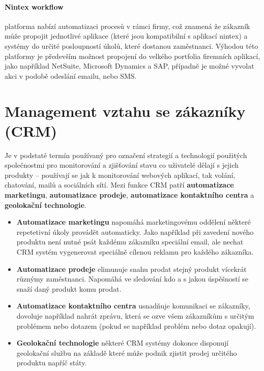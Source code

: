 \paragraph{Nintex workflow} platforma nabízí automatizaci procesů v rámci firmy, což znamená že zákazník může propojit jednotlivé aplikace (které jsou kompatibilní s aplikací nintex) a systémy do určité posloupností úkolů, které dostanou zaměstnanci. Výhodou této platformy je především možnost propojení do velkého portfolia firemních aplikací, jako například NetSuite, Microsoft Dynamics a SAP, případně je možné vyvolat akci v podobě odeslání emailu, nebo SMS.

\section{Management vztahu se zákazníky (CRM)}
\par Je v podstatě termín používaný pro označení strategií a technologií použitých společnostmi pro monitorování a zjišťování stavu co uživatelé dělají s jejich produkty -- používají se jak k monitorování webových aplikací, tak volání, chatování, mailů a sociálních sítí. Mezi funkce CRM patří \textbf{automatizace marketingu}, \textbf{automatizace prodeje}, \textbf{automatizace kontaktního centra} a \textbf{geolokační technologie}. \cite{crm}

\begin{itemize}
  \item \textbf{Automatizace marketingu} napomáhá marketingovému oddělení některé repetetivní úkoly provádět automaticky. Jako například při zavedení nového produktu není nutné psát každému zákazníku speciální email, ale nechat CRM systém vygenerovat speciálně cílenou reklamu pro každého zákazníka.
  \item \textbf{Automatizace prodeje} elimunuje snahu prodat stejný produkt vícekrát různýmy zaměstnanci. Napomáhá ve sledování kdo a s jakou úspěšností se snaží daný produkt komu prodat.
  \item \textbf{Automatizace kontaktního centra} usnadňuje komunikaci se zákazníky, dovoluje například nahrát zprávu, která se ozve všem zákazníkům s určitým problémem nebo dotazem (pokud se například problém nebo dotaz opakují).
  \item \textbf{Geolokační technologie} některé CRM systémy dokonce disponují geolokační službu na základě které může podnik zjistit prodej určitého produktu napříč státy. \cite{crm}
\end{itemize}

